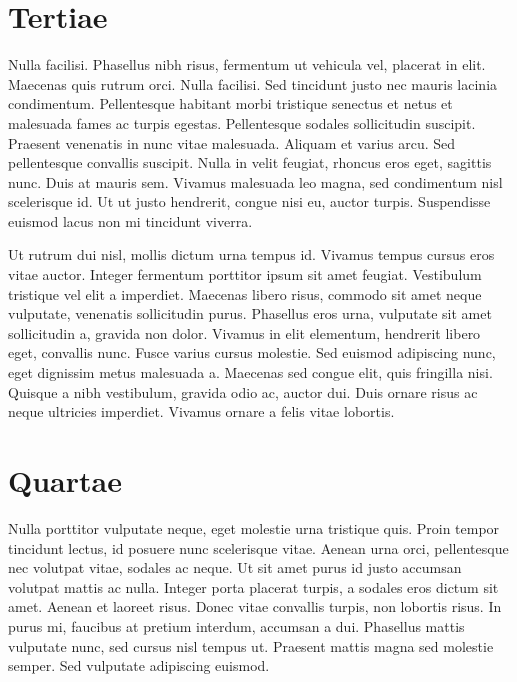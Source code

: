 \documentclass[a0paper]{test1}
\begin{document}
\section*{Tertiae}
Nulla facilisi. Phasellus nibh risus, fermentum ut vehicula vel, placerat in elit. Maecenas quis rutrum orci. Nulla facilisi. Sed tincidunt justo nec mauris lacinia condimentum. Pellentesque habitant morbi tristique senectus et netus et malesuada fames ac turpis egestas. Pellentesque sodales sollicitudin suscipit. Praesent venenatis in nunc vitae malesuada. Aliquam et varius arcu. Sed pellentesque convallis suscipit. Nulla in velit feugiat, rhoncus eros eget, sagittis nunc. Duis at mauris sem. Vivamus malesuada leo magna, sed condimentum nisl scelerisque id. Ut ut justo hendrerit, congue nisi eu, auctor turpis. Suspendisse euismod lacus non mi tincidunt viverra.

Ut rutrum dui nisl, mollis dictum urna tempus id. Vivamus tempus cursus eros vitae auctor. Integer fermentum porttitor ipsum sit amet feugiat. Vestibulum tristique vel elit a imperdiet. Maecenas libero risus, commodo sit amet neque vulputate, venenatis sollicitudin purus. Phasellus eros urna, vulputate sit amet sollicitudin a, gravida non dolor. Vivamus in elit elementum, hendrerit libero eget, convallis nunc. Fusce varius cursus molestie. Sed euismod adipiscing nunc, eget dignissim metus malesuada a. Maecenas sed congue elit, quis fringilla nisi. Quisque a nibh vestibulum, gravida odio ac, auctor dui. Duis ornare risus ac neque ultricies imperdiet. Vivamus ornare a felis vitae lobortis.


\section*{Quartae}
Nulla porttitor vulputate neque, eget molestie urna tristique quis. Proin tempor tincidunt lectus, id posuere nunc scelerisque vitae. Aenean urna orci, pellentesque nec volutpat vitae, sodales ac neque. Ut sit amet purus id justo accumsan volutpat mattis ac nulla. Integer porta placerat turpis, a sodales eros dictum sit amet. Aenean et laoreet risus. Donec vitae convallis turpis, non lobortis risus. In purus mi, faucibus at pretium interdum, accumsan a dui. Phasellus mattis vulputate nunc, sed cursus nisl tempus ut. Praesent mattis magna sed molestie semper. Sed vulputate adipiscing euismod.
\end{document}
